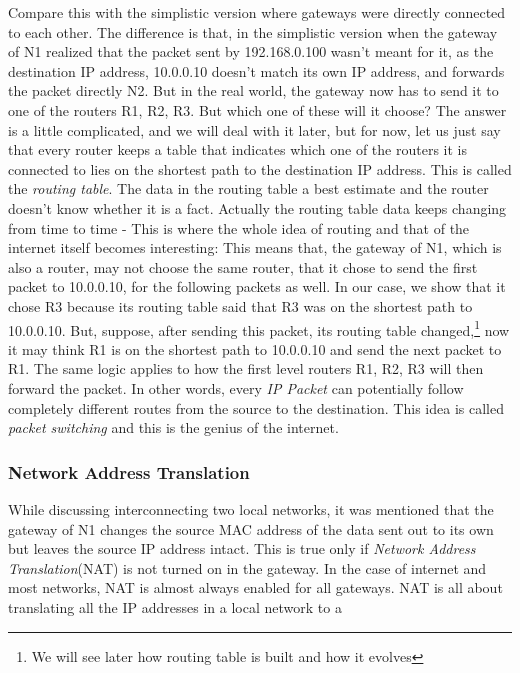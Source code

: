 Compare this with the simplistic version where gateways were directly connected to each other. The difference is that, in the simplistic version when the gateway of N1 realized that the packet sent by 192.168.0.100 wasn't meant for it, as the destination IP address, 10.0.0.10 doesn't match its own IP address, and forwards the packet directly N2. But in the real world, the gateway now has to send it to one of the routers R1, R2, R3. But which one of these will it choose? The answer is a little complicated, and we will deal with it later, but for now, let us just say that every router keeps a table that indicates which one of the routers it is connected to lies on the shortest path to the destination IP address. This is called the \emph{routing table}. The data in the routing table a best estimate and the router doesn't know whether it is a fact. Actually the routing table data keeps changing from time to time - This is where the whole idea of routing and that of the internet itself becomes interesting: This means that, the gateway of N1, which is also a router, may not choose the same router, that it chose to send the first packet to 10.0.0.10, for the following packets as well. In our case, we show that it chose R3 because its routing table said that R3 was on the shortest path to 10.0.0.10. But, suppose, after sending this packet, its routing table changed,\footnote{We will see later how routing table is built and how it evolves} now it may think R1 is on the shortest path to 10.0.0.10 and send the next packet to R1. The same logic applies to how the first level routers R1, R2, R3 will then forward the packet. In other words, every \emph{IP Packet} can potentially follow completely different routes from the source to the destination. This idea is called \emph{packet switching} and this is the genius of the internet. 

\subsubsection{Network Address Translation}
While discussing interconnecting two local networks, it was mentioned that the gateway of N1 changes the source MAC address of the data sent out to its own but leaves the source IP address intact. This is true only if \emph{Network Address Translation}(NAT) is not turned on in the gateway. In the case of internet and most networks, NAT is almost always enabled for all gateways. NAT is all about translating all the IP addresses in a local network to a 




